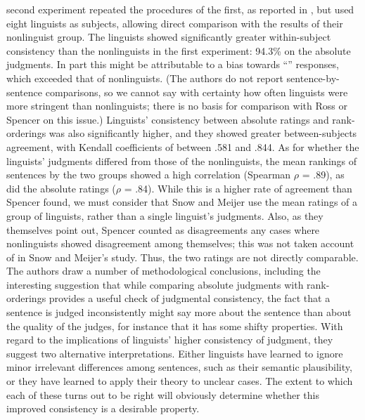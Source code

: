 second experiment repeated the procedures of the first, as reported in , but used eight linguists as subjects, allowing direct comparison with the results of their nonlinguist group. The linguists showed significantly greater within-subject consistency than the nonlinguists in the first experiment: 94.3\% on the absolute judgments. In part this might be attributable to a bias towards ``\textminus'' responses, which exceeded that of nonlinguists. (The authors do not report sentence-by-sentence comparisons, so we cannot say with certainty how often linguists were more stringent than nonlinguists; there is no basis for comparison with Ross or Spencer on this issue.) Linguists' consistency between absolute ratings and rank-orderings was also significantly higher, and they showed greater between-subjects agreement, with Kendall coefficients of between .581 and .844. As for whether the linguists' judgments differed from those of the nonlinguists, the mean rankings of sentences by the two groups
showed a high correlation (Spearman {$\rho$} = .89), as did the absolute ratings ({$\rho$} = .84). While this is a higher rate of agreement than Spencer found, we must consider that Snow and Meijer use the mean ratings of a group of linguists, rather than a single linguist's judgments. Also, as they themselves point out, Spencer counted as disagreements any cases where nonlinguists showed disagreement among themselves; this was not taken account of in Snow and Meijer's study. Thus, the two ratings are not directly comparable. The authors draw a number of methodological conclusions, including the interesting suggestion that while comparing absolute judgments with rank-orderings provides a useful check of judgmental consistency, the fact that a sentence is judged inconsistently might say more about the sentence than about the quality of the judges, for instance that it has some shifty properties. With regard to the implications of linguists' higher consistency of judgment, they suggest two alternative interpretations. Either linguists have learned to ignore minor irrelevant differences among sentences, such as their semantic plausibility, or they have learned to apply their theory to unclear cases. The extent to which each of these turns out to be right will obviously determine whether this improved consistency is a desirable property.

